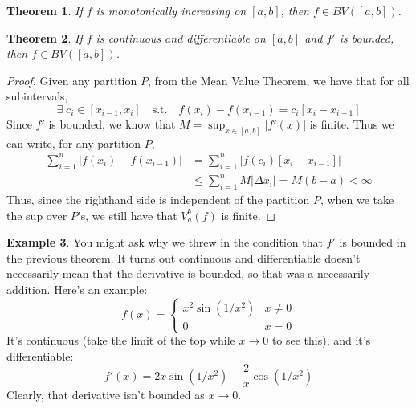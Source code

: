 \documentclass[12pt]{article}
\theoremstyle{plain}
\newtheorem{thm}{Theorem}[subsection]
\theoremstyle{definition}
\newtheorem{ex}[thm]{Example}
\theoremstyle{remark}
\begin{document}
\begin{thm}
If $f$ is monotonically increasing on $[a,b]$, then $f\in BV([a,b])$.
\end{thm}

\begin{thm}
If $f$ is continuous and differentiable on $[a,b]$ and $f'$ is bounded, then $f\in BV([a,b])$.
\end{thm}
\begin{proof}
Given any partition $P$, from the Mean Value Theorem, we have that for all subintervals, 
    \[ \exists\; c_i \in [x_{i-1}, x_i] \quad \text{s.t.}
        \quad f(x_i) - f(x_{i-1}) = c_i \left[
        x_i - x_{i-1}\right]    \]
Since $f'$ is bounded, we know that $M=\sup_{x\in[a,b]} |f'(x)|$ is finite. Thus we can write, for any partition $P$,
\begin{align*}
    \sum^n_{i=1} \left\lvert f(x_i) - f(x_{i-1})
        \right\rvert &= \sum^n_{i=1} \left\lvert f(c_i) 
        \left[x_i - x_{i-1}\right] \right\rvert \\
    &\leq \sum^n_{i=1} M \left\lvert \Delta x_i 
        \right\rvert = M(b-a) < \infty 
\end{align*}
Thus, since the righthand side is independent of the partition $P$, when we take the sup over $P$'s, we still have that $V_a^b(f)$ is finite.
\end{proof}

\begin{ex}
You might ask why we threw in the condition that $f'$ is bounded in the previous theorem.  It turns out continuous and differentiable doesn't necessarily mean that the derivative is bounded, so that was a necessarily addition.  Here's an example:
    \[ f(x) =
        \begin{cases} 
            x^2 \sin(1/x^2) & x \neq 0\\
            0               & x = 0
        \end{cases}  \]
It's continuous (take the limit of the top while $x\rightarrow 0$ to see this), and it's differentiable:
    \[ f'(x) = 2x \sin(1/x^2) - \frac{2}{x} \cos(1/x^2) \]
Clearly, that derivative isn't bounded as $x\rightarrow 0$.
\end{ex}
\end{document}

